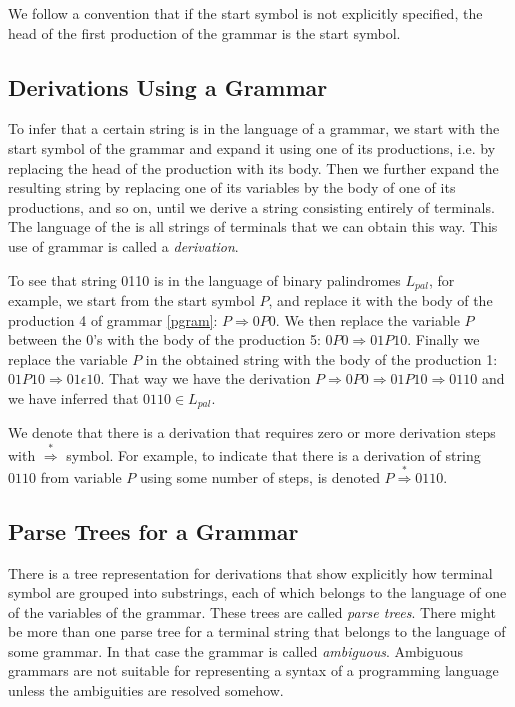 \documentclass[a4paper,oneside,11pt]{book}
\theoremstyle{definition}
\begin{document}
We follow a convention that if the start symbol is not explicitly specified, the head of the first production of the grammar is the start symbol.

\subsection{Derivations Using a Grammar}

To infer that a certain string is in the language of a grammar, we start with the start symbol of the grammar
and expand it using one of its productions, i.e. by replacing the head of the production with its body.
Then we further expand the resulting string by replacing one of its variables by the body of one of its productions,
and so on, until we derive a string consisting entirely of terminals. The language of the is all strings of terminals that
we can obtain this way. This use of grammar is called a \emph{derivation}.

To see that string 0110 is in the language of binary palindromes $L_{pal}$, for example, we start from the start symbol $P$,
and replace it with the body of the production 4 of grammar \ref{pgram}: $P \Rightarrow 0P0$. We then replace the variable $P$ between the 0's with
the body of the production 5: $0P0 \Rightarrow 01P10$. Finally we replace the variable $P$ in the obtained string with
the body of the production 1: $01P10 \Rightarrow 01 \epsilon 10$.
That way we have the derivation $P \Rightarrow 0P0 \Rightarrow 01P10 \Rightarrow 0110$ and we have inferred that
$0110 \in L_{pal}$.

We denote that there is a derivation that requires zero or more derivation steps with $\overset{*}{\Rightarrow}$ symbol.
For example, to indicate that there is a derivation of string $0110$ from variable $P$ using some number of steps,
is denoted $P \overset{*}{\Rightarrow} 0110$.

\subsection{Parse Trees for a Grammar}

There is a tree representation for derivations that show explicitly how terminal symbol are grouped into substrings,
each of which belongs to the language of one of the variables of the grammar. These trees are called \emph{parse trees}.
There might be more than one parse tree for a terminal string that belongs to the language of some grammar.
In that case the grammar is called \emph{ambiguous}. Ambiguous grammars are not suitable for representing a syntax
of a programming language unless the ambiguities are resolved somehow.
\end{document}
